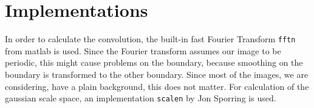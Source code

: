 
\chapter{Implementations} %

\label{AppendixB} %


In order to calculate the convolution, the built-in fast Fourier Transform \texttt{fftn} from matlab is used. Since the Fourier transform assumes our image to be periodic, this might cause problems on the boundary, because smoothing on the boundary is transformed to the other boundary. Since most of the images, we are considering, have a plain background, this does not matter. For calculation of the gaussian scale space, an implementation \texttt{scalen} by Jon Sporring is used.\\